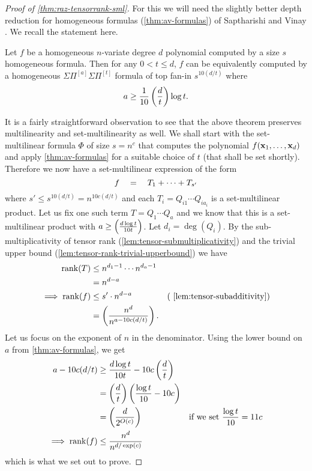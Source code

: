 \begin{proof}[Proof of \autoref{thm:raz-tensorrank-sml}]



For this we will need the slightly better depth reduction for homogeneous formulas (\autoref{thm:av-formulas}) of Saptharishi and Vinay \cite{saptharishivinay14}. We recall the statement here.
\begin{theorem*}
Let $f$ be a homogeneous $n$-variate degree $d$ polynomial computed by a size $s$ homogeneous formula. 
Then for any $0< t \leq d$, $f$ can be equivalently computed by a homogeneous $\Sigma\Pi^{[a]}\Sigma\Pi^{[t]}$ formula of top fan-in $s^{10(d/t)}$ where 
\[
a \geq \frac{1}{10}\left(\frac{d}{t}\right) \log t.
\]
\end{theorem*}
It is a fairly straightforward observation to see that the above theorem preserves multilinearity and set-multilinearity as well. We shall start with the set-multilinear formula $\Phi$ of size $s = n^c$ that computes the polynomial $f(\mathbf{x}_1,\ldots, \mathbf{x}_d)$ and apply \autoref{thm:av-formulas} for a suitable choice of $t$ (that shall be set shortly). 
Therefore we now have a set-multilinear expression of the form
\[
f \quad = \quad T_1 + \cdots + T_{s'}
\]
where $s' \leq s^{10(d/t)} = n^{10c(d/t)}$ and each $T_i = Q_{i1} \cdots Q_{ia_i}$ is a set-multilinear product. Let us fix one such term $T = Q_{1} \cdots Q_a$ and we know that this is a set-multilinear product with $a \geq \left(\frac{d\log t}{10 t}\right)$. Let $d_i = \deg(Q_i)$. By the sub-multiplicativity of tensor rank (\autoref{lem:tensor-submultiplicativity}) and the trivial upper bound (\autoref{lem:tensor-rank-trivial-upperbound}) we have
\begin{align*}
\rank(T) & \leq n^{d_1 - 1} \cdots n^{d_a - 1}\\
 & =  n^{d - a}\\
\implies \rank(f) & \leq s' \cdot n^{d-a} & \text{(~\autoref{lem:tensor-subadditivity})}\\
 & =  \pfrac{n^d}{n^{a - 10c(d/t)}}.
\end{align*}
Let us focus on the exponent of $n$ in the denominator. Using the lower bound on $a$ from \autoref{thm:av-formulas}, we get
\begin{align*}
a - 10c(d/t) & \geq \frac{d\log t}{10t} - 10c\left(\frac{d}{t}\right)\\
& = \left(\frac{d}{t}\right) \left(\frac{\log t}{10} - 10c\right)\\
& = \left(\frac{d}{2^{O(c)}}\right)& \text{if we set $\frac{\log t}{10} = 11c$}\\
\implies \operatorname{rank}(f) & \leq \frac{n^d}{n^{d/\exp(c)}}
\end{align*}
which is what we set out to prove. 
\end{proof}

